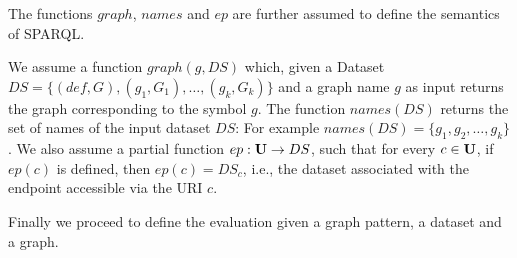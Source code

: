The functions $graph$, $names$ and $ep$ are further assumed to define the
semantics of SPARQL.
\begin{definition}
	We assume a function $graph(g,DS)$ which, given a Dataset $DS=\{(def, G), (g_1,G_1), \dots, (g_k, G_k) \}$
	and a graph name $g$ as
	input returns the graph corresponding to the symbol $g$. The function
	$names(DS)$ returns the set of names of the input dataset $DS$:
	For example $names(DS) = \{g_1,g_2,\dots,g_k\}$.
	We also assume a partial function $ep: \mathbf{U} \rightarrow DS$, such that for every $c \in
	\mathbf{U}$, if $ep(c)$ is defined, then $ep(c) = DS_c$, i.e., the dataset associated with
	the endpoint accessible via the URI $c$.
\end{definition}
Finally we proceed to define the evaluation given a graph pattern, a dataset and
a graph.
